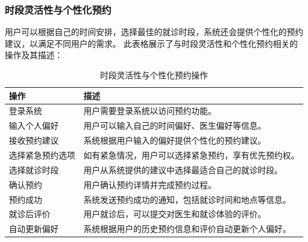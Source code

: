 \subsubsection{时段灵活性与个性化预约}
用户可以根据自己的时间安排，选择最佳的就诊时段，系统还会提供个性化的预约建议，以满足不同用户的需求。
此表格展示了与时段灵活性和个性化预约相关的操作及其描述：
\begin{table}[htbp]
	\centering
	\begin{tabular}{|p{6cm}|p{6cm}|}
		\hline
		\textbf{操作} & \textbf{描述} \\
		\hline
		登录系统 & 用户需要登录系统以访问预约功能。 \\
		输入个人偏好 & 用户可以输入自己的时间偏好、医生偏好等信息。 \\
		接收预约建议 & 系统根据用户输入的偏好提供个性化的预约建议。 \\
		选择紧急预约选项 & 如有紧急情况，用户可以选择紧急预约，享有优先预约权。 \\
		选择就诊时段 & 用户从系统提供的建议中选择最适合自己的就诊时段。 \\
		确认预约 & 用户确认预约详情并完成预约过程。 \\
		预约成功 & 系统发送预约成功的通知，包括就诊时间和地点等信息。 \\
		就诊后评价 & 用户就诊后，可以提交对医生和就诊体验的评价。 \\
		自动更新偏好 & 系统根据用户的历史预约信息和评价自动更新个人偏好。 \\
		\hline
	\end{tabular}
	\caption{时段灵活性与个性化预约操作}
\end{table}


